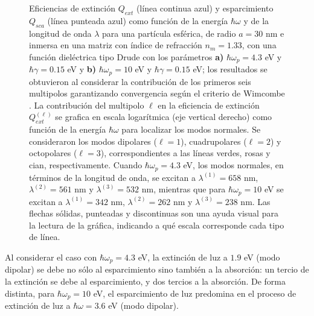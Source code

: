\begin{figure}[h!]
\begin{subfigure}{.45\linewidth}
	\end{subfigure}\vspace*{-.7em}
	\caption{Eficiencias de extinción $Q_{ext}$ (línea continua azul) y esparcimiento $Q_{sca}$ (línea punteada azul) como función de la energía $\hbar\omega$ y de la longitud de onda $\lambda$ para una partícula esférica, de radio $a=30$ nm e inmersa en una matriz con índice de refracción $n_m=1.33$, con una función dieléctrica tipo Drude con los parámetros \textbf{a)} $\hbar\omega_p=4.3$ eV y $\hbar\gamma = 0.15$ eV y \textbf{b)} $\hbar\omega_p=10$ eV y $\hbar\gamma = 0.15$ eV; los resultados se obtuvieron al considerar la contribución de los primeros seis multipolos garantizando convergencia según el criterio de Wimcombe \cite{bohren1998absorption}. La contribución del multipolo $\ell$ en la eficiencia de extinción $Q_{ext}^{(\ell)}$ se grafica en escala logarítmica (eje vertical derecho) como función de la energía $\hbar\omega$ para localizar los modos normales. Se consideraron los modos dipolares ($\ell =1$), cuadrupolares ($\ell = 2$) y octopolares ($\ell = 3$), correspondientes a las líneas verdes, rosas y cian, respectivamente.  Cuando $\hbar\omega_p = 4.3$ eV, los modos normales, en términos de la longitud de onda, se excitan a $\lambda^{(1)}= 658$ nm, $\lambda^{(2)}= 561$ nm y $\lambda^{(3)}= 532 $ nm, mientras que para $\hbar\omega_p = 10$ eV se excitan a $\lambda^{(1)}= 342$ nm, $\lambda^{(2)}= 262$ nm y $\lambda^{(3)}= 238$ nm. Las flechas sólidas, punteadas y discontinuas son una ayuda visual para la lectura de la gráfica, indicando a qué escala corresponde cada tipo de línea.}
	\label{fig:QextDrude}
	\end{figure}	

Al considerar el caso con $\hbar\omega_p = 4.3$ eV, la extinción de luz a $1.9$ eV (modo dipolar) se debe no sólo al esparcimiento sino también a la absorción: un tercio de la extinción se debe al esparcimiento, y dos tercios a la absorción. De forma distinta, para $\hbar\omega_p = 10$ eV, el esparcimiento de luz predomina en el proceso de extinción de luz a $\hbar\omega= 3.6	$ eV (modo dipolar).












